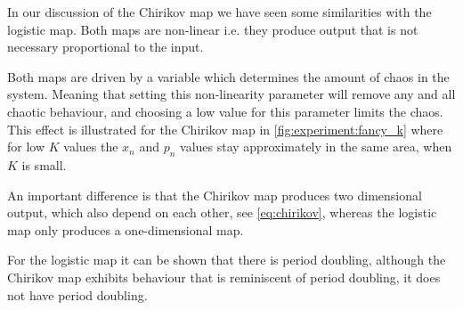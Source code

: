 
In our discussion of the Chirikov map we have seen some similarities with the logistic map. Both maps are non-linear i.e. they produce output that is not necessary proportional to the input. 

Both maps are driven by a variable which determines the amount of chaos in the system. Meaning that setting this non-linearity parameter will remove any and all chaotic behaviour, and choosing a low value for this parameter limits the chaos. This effect is illustrated for the Chirikov map in \cref{fig:experiment:fancy_k} where for low $K$ values the $x_n$ and $p_n$ values stay approximately in the same area, when $K$ is small. 

An important difference is that the Chirikov map produces two dimensional output, which also depend on each other, see \eqref{eq:chirikov}, whereas the logistic map only produces a one-dimensional map. 

For the logistic map it can be shown that there is period doubling, although the Chirikov map exhibits behaviour that is reminiscent of period doubling, it does not have period doubling. 

